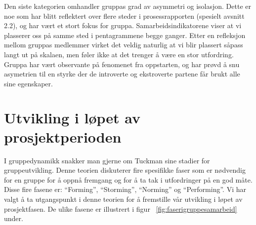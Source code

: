 Den siste kategorien omhandler gruppas grad av asymmetri og isolasjon. Dette er noe som har blitt reflektert over flere steder i prosessrapporten (spesielt avsnitt 2.2), og har vært et stort fokus for gruppa. Samarbeidsindikatorene viser at vi plasserer oss på samme sted i pentagrammene begge ganger. Etter en refleksjon mellom gruppas medlemmer virket det veldig naturlig at vi blir plassert såpass langt ut på skalaen, men føler ikke at det trenger å være en stor utfordring. Gruppa har vært observante på fenomenet fra oppstarten, og har prøvd å snu asymetrien til en styrke der de introverte og ekstroverte partene får brukt alle sine egenskaper.\\


\section{Utvikling i løpet av prosjektperioden}
\label{sec:utvikling}
I gruppedynamikk snakker man gjerne om Tuckman sine stadier for gruppeutvikling. Denne teorien diskuterer fire spesifikke faser som er nødvendig for en gruppe for å oppnå fremgang og for å ta tak i utfordringer på en god måte. Disse fire fasene er: ``Forming'', ``Storming'', ``Norming'' og ``Performing''. Vi har valgt å ta utgangspunkt i denne teorien for å fremstille vår utvikling i løpet av prosjektfasen. De ulike fasene er illustrert i figur ~\ref{fig:faserigruppesamarbeid} under.\\

